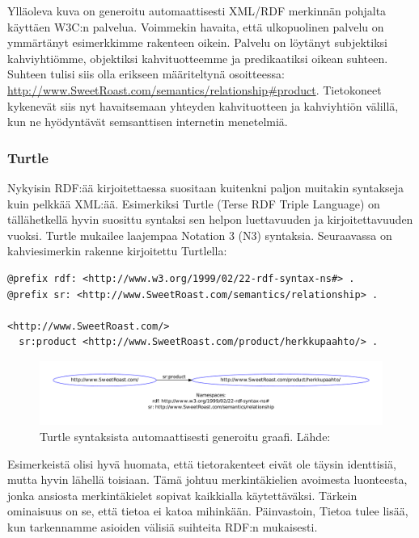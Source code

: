 \documentclass[finnish, 12pt, a4paper, elec, utf8, pdfa, online]{aaltothesis}
\begin{document}
Ylläoleva kuva on generoitu automaattisesti XML/RDF merkinnän pohjalta käyttäen W3C:n palvelua. Voimmekin havaita, että ulkopuolinen palvelu on ymmärtänyt esimerkkimme rakenteen oikein. Palvelu on löytänyt subjektiksi kahviyhtiömme, objektiksi kahvituotteemme ja predikaatiksi oikean suhteen. Suhteen tulisi siis olla erikseen määriteltynä osoitteessa: \url{http://www.SweetRoast.com/semantics/relationship\#product}. Tietokoneet kykenevät siis nyt havaitsemaan yhteyden kahvituotteen ja kahviyhtiön välillä, kun ne hyödyntävät semsanttisen internetin menetelmiä.

\subsubsection{Turtle}
Nykyisin RDF:ää kirjoitettaessa suositaan kuitenkni paljon muitakin syntakseja kuin pelkkää XML:ää. Esimerkiksi Turtle (Terse RDF Triple Language) on tällähetkellä hyvin suosittu syntaksi sen helpon luettavuuden ja kirjoitettavuuden vuoksi. Turtle mukailee laajempaa Notation 3 (N3) syntaksia. Seuraavassa on kahviesimerkin rakenne kirjoitettu Turtlella:

\vskip 0.75cm
\begin{lstlisting}
@prefix rdf: <http://www.w3.org/1999/02/22-rdf-syntax-ns#> .
@prefix sr: <http://www.SweetRoast.com/semantics/relationship> .

<http://www.SweetRoast.com/>
  sr:product <http://www.SweetRoast.com/product/herkkupaahto/> .
\end{lstlisting}
\vskip 0.75cm


\begin{figure}[htb]
\centering
\includegraphics[width=15cm]{images/RDF-triplet2.pdf}
\caption{Turtle syntaksista automaattisesti generoitu graafi. Lähde: \cite{SeCo_RDF_validator} \label{images/RDF-triplet2}}
\end{figure}


Esimerkeistä olisi hyvä huomata, että tietorakenteet eivät ole täysin identtisiä, mutta hyvin lähellä toisiaan. Tämä johtuu merkintäkielien avoimesta luonteesta, jonka ansiosta merkintäkielet sopivat kaikkialla käytettäväksi. Tärkein ominaisuus on se, että tietoa ei katoa mihinkään. Päinvastoin, Tietoa tulee lisää, kun tarkennamme asioiden välisiä suihteita RDF:n mukaisesti.
\end{document}
